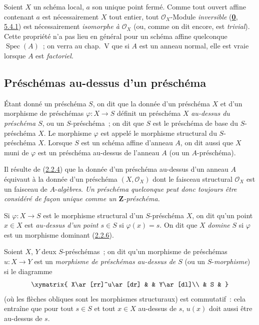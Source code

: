 \begin{remark}[2.4.8]
\label{I.2.4.8-fr}
Soient $X$ un schéma local, $a$ son unique point fermé. Comme tout ouvert
affine contenant $a$ est nécessairement $X$ tout entier, tout
$\mathscr{O}_X$-Module \emph{inversible}
(\hyperref[0.5.4.1-fr]{\textbf{0}, 5.4.1}) est nécessairement \emph{isomorphe à
$\mathscr{O}_X$} (ou, comme on dit encore, est \emph{trivial}). Cette propriété
n'a pas lieu en général pour un schéma affine quelconque
$\operatorname{Spec}(A)$~; on verra au chap.~V que si $A$ est un anneau normal,
elle est vraie lorsque $A$ est \emph{factoriel}.
\end{remark}

\subsection{Préschémas au-dessus d'un préschéma}
\label{subsection:I.2.5-fr}

\begin{definition}[2.5.1]
\label{I.2.5.1-fr}
Étant donné un préschéma $S$, on dit que la donnée d'un préschéma $X$ et d'un
morphisme de préschémas $\varphi:X\to S$ définit un préschéma $X$ \emph{au-dessus
du préschéma $S$}, ou un $S$-préschéma~; on dit que $S$ est le
préschéma de base du $S$-préschéma $X$. Le morphisme $\varphi$ est appelé
le morphisme structural du $S$-préschéma $X$. Lorsque $S$ est un schéma
affine d'anneau $A$, on dit aussi que $X$ muni de $\varphi$ est un préschéma
\textup{au-dessus de l'anneau} $A$ (ou un $A$-préschéma).
\end{definition}

Il résulte de (\hyperref[I.2.2.4-fr]{2.2.4}) que la donnée d'un préschéma
au-dessus d'un anneau $A$ équivaut à la donnée d'un préschéma
$(X,\mathscr{O}_X)$ dont le faisceau structural $\mathscr{O}_X$ est un faisceau
de $A$-\emph{algèbres}. \emph{Un préschéma quelconque peut donc toujours être
considéré de façon unique comme un $\mathbf{Z}$-préschéma.}

Si $\varphi:X\to S$ est le morphisme structural d'un $S$-préschéma $X$, on dit
qu'un point $x\in X$ est \emph{au-dessus d'un point $s\in S$} si
$\varphi(x)=s$. On dit que $X$ \emph{domine} $S$ si $\varphi$ est un morphisme
dominant (\hyperref[I.2.2.6-fr]{2.2.6}).

\begin{env}[2.5.2]
\label{I.2.5.2-fr}
Soient $X$, $Y$ deux $S$-préschémas~; on dit qu'un morphisme de préschémas
$u:X\to Y$ est un \emph{morphisme de préschémas au-dessus de $S$} (ou un
$S$-\emph{morphisme}) si le diagramme
\label{I.2.5.2.diagram-fr}
\[
  \xymatrix{
    X\ar[rr]^u\ar[dr] & & Y\ar[dl]\\
    & S &
  }
\]
(où les flèches obliques sont les morphismes structuraux) est commutatif~:
cela entraîne que pour tout $s\in S$ et tout $x\in X$ au-dessus de $s$, $u(x)$
doit aussi être au-dessus de $s$.
\end{env}

